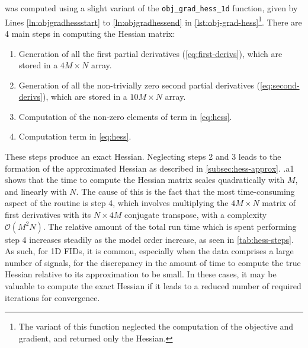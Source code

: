 was computed using a slight variant of the \texttt{obj\_grad\_hess\_1d}
function, given by Lines \ref{ln:objgradhessstart} to
\ref{ln:objgradhessend} in \cref{lst:obj-grad-hess}\footnote{
    The variant of this function neglected the computation of the objective and
    gradient, and returned only the Hessian.
}. There are 4 main steps in computing the Hessian matrix:
\begin{enumerate}
    \item Generation of all the first partial derivatives
        (\cref{eq:first-derivs}), which are stored in a $4M \times N$ array.
    \item Generation of all the non-trivially zero second partial
        derivatives (\cref{eq:second-derivs}), which are stored in a $10M
        \times N$ array.
    \item Computation of the non-zero elements of term  in
        \cref{eq:hess}.
    \item Computation term  in \cref{eq:hess}.
\end{enumerate}
These steps produce an exact Hessian. Neglecting steps 2 and 3 leads to the
formation of the approximated Hessian as described in
\cref{subsec:hess-approx}. .a1 shows that the
time to compute the Hessian matrix scales quadratically with $M$, and
linearly with $N$. The cause of this is the fact that the most time-consuming
aspect of the routine is step 4, which involves multiplying the $4M \times N$
matrix of first derivatives with its  $N \times 4M$ conjugate transpose, with a
complexity $\mathcal{O}(M^2N)$. The relative amount of the total run time which
is spent performing step 4 increases steadily as the model order increase, as
seen in \cref{tab:hess-steps}.
As such, for \ac{1D} \acp{FID}, it is
common, especially when the data comprises a large number of
signals, for the discrepancy in the amount of time to compute the true
Hessian relative to its approximation to be small. In these cases, it may be
valuable to compute the exact Hessian if it leads to a reduced number of
required iterations for convergence.
